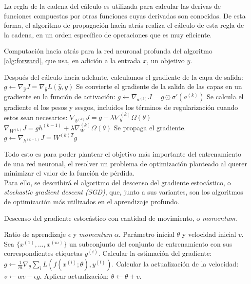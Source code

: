 \begin{itemize}
La regla de la cadena del cálculo es utilizada para calcular las derivas de funciones compuestas por otras funciones cuyas derivadas son conocidas. De esta forma, el algoritmo de propagación hacia atrás realiza el cálculo de esta regla de la cadena, en un orden específico de operaciones que es muy eficiente. \\
\begin{algorithm}
\caption{Computación hacia atrás para la red neuronal profunda del algoritmo \autoref{alg:forward}, que usa, en adición a la entrada $x$, un objetivo $y$. \cite{Goodfellow-et-al-2016}}
\begin{algorithmic}
\STATE Después del cálculo hacia adelante, calculamos el gradiente de la capa de salida:
\STATE $g\leftarrow\nabla_{\hat{y}}J=\nabla_{\hat{y}}L(\hat{y},y)$
\STATE Se convierte el gradiente de la salida de las capas en un gradiente en la función de activación:
\STATE $g\leftarrow \nabla_{a^(k)}J=g\odot\sigma'(a^{(k)})$
\STATE Se calcula el gradiente el los pesos y sesgos, incluidos los términos de regularización cuando estos sean necesarios:
\STATE $\nabla_{b^{(k)}}J=g+\lambda\nabla_b^(k)\Omega(\theta)$
\STATE $\nabla_{W^{(k)}}J=gh^{(k-1)}+\lambda\nabla_W^{(k)}\Omega(\theta)$
\STATE Se propaga el gradiente.
\STATE $g\leftarrow \nabla_{h^{(k-1)}}J=W^{(k)T}g$
\ENDFOR
\end{algorithmic}
\end{algorithm}

Todo esto es para poder plantear el objetivo más importante del entrenamiento de una red neuronal, el resolver un problema de optimización planteado al querer minimizar el valor de la función de pérdida. \\

Para ello, se describirá el algoritmo del descenso del gradiente estocástico, o \emph{stochastic gradient descent (SGD)}, que, junto a sus variantes, son los algoritmos de optimización más utilizados en el aprendizaje profundo. \\

\begin{algorithm}
\caption{Descenso del gradiente estocástico con cantidad de movimiento, o \emph{momentum}. \cite{Goodfellow-et-al-2016}}
\begin{algorithmic}
\REQUIRE Ratio de aprendizaje $\epsilon$ y \emph{momentum} $\alpha$.
\REQUIRE Parámetro inicial $\theta$ y velocidad inicial $v$.
\STATE Sea $\{x^{(1)},...,x^{(m)}\}$  un subconjunto del conjunto de entrenamiento con sus correspondientes etiquetas $y^{(i)}$.
\STATE Calcular la estimación del gradiente: $g\leftarrow \frac{1}{m}\nabla_\theta \sum_i L(f(x^{(i)};\theta),y^{(i)})$.
\STATE Calcular la actualización de la velocidad: $v \leftarrow \alpha v - \epsilon g$.
\STATE Aplicar actualización: $\theta \leftarrow \theta + v$.
\ENDWHILE
\end{algorithmic}
\end{algorithm}


\end{itemize}
